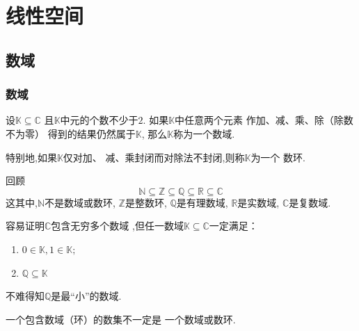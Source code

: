 \newpage
\chapter{线性空间}
\setcounter{section}{0}
\section{数域}
\subsection{数域}
\begin{formal}
\begin{definition}[数域与数环]\label{def:数域与数环}
    设$\mathbb{K} \subseteq \mathbb{C} $
    且$\mathbb{K} $中元的个数不少于$2$.
    如果$\mathbb{K} $中任意两个元素
    作加、减、乘、除（除数不为零）
    得到的结果仍然属于$\mathbb{K} $,
    那么$\mathbb{K} $称为一个数域.
   
    特别地,如果$\mathbb{K} $仅对加、
    减、乘封闭而对除法不封闭,则称$\mathbb{K} $为一个
    数环.
\end{definition}
\end{formal}
\begin{brown}
    \begin{example}
回顾
\[
\mathbb{N}
\subseteq \mathbb{Z} 
\subseteq \mathbb{Q} 
\subseteq \mathbb{R} 
\subseteq \mathbb{C} 
\]
这其中,$\mathbb{N}$不是数域或数环,
$\mathbb{Z} $是整数环,
$\mathbb{Q} $是有理数域,
$\mathbb{R} $是实数域,
$\mathbb{C} $是复数域.
    \end{example}\end{brown}
    \begin{green}\begin{lemma}[最小的数域]\label{lem:最小的数域}
容易证明$\mathbb{C} $包含无穷多个数域
,但任一数域$\mathbb{K} 
\subseteq \mathbb{C}$一定满足：
\setcounter{equation}{0}%
\begin{enumerate}[label=\textup{(\arabic*)}]
    \item $0 \in \mathbb{K} ,
    1 \in \mathbb{K} ; $
    \item $\mathbb{Q} 
    \subseteq \mathbb{K}$
\end{enumerate}
不难得知$\mathbb{Q}$是最“小”的数域.
\end{lemma}\end{green}
\begin{red}\begin{remark}
    一个包含数域（环）的数集不一定是
一个数域或数环.
\end{remark}
\end{red}
